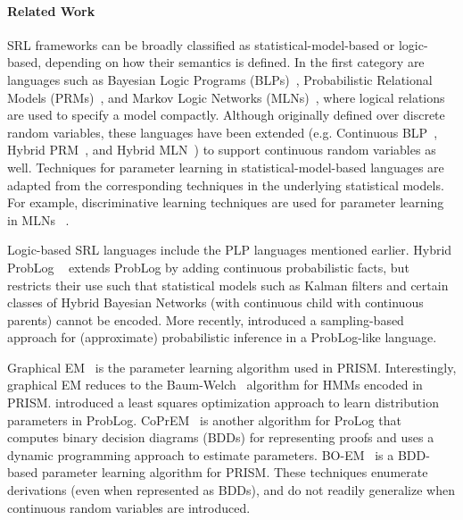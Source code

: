 \paragraph{Related Work}
SRL frameworks can be broadly classified as
statistical-model-based or logic-based, depending on how their
semantics is defined.  In the first category are languages such as
Bayesian Logic Programs (BLPs)~\cite{hblp}, Probabilistic Relational
Models (PRMs)~\cite{hprm}, and Markov Logic Networks (MLNs)~\cite{mln},
where logical relations are used to specify a model compactly.
Although originally defined over discrete random variables, these
languages have been extended (e.g.  Continuous
BLP~\cite{hblp}, Hybrid PRM~\cite{hprm}, and Hybrid
MLN~\cite{hmln}) to support continuous random variables as
well.  Techniques for parameter learning in statistical-model-based
languages are adapted from the corresponding techniques in the
underlying statistical models.  For example, discriminative learning
techniques are used for parameter learning in MLNs
~\cite{mlnlearningA,mlnlearningB}.

Logic-based SRL languages include the PLP languages mentioned earlier.
Hybrid ProbLog ~\cite{hproblog} extends ProbLog by adding
continuous probabilistic facts, but restricts their use such that
statistical models such as Kalman filters and certain classes of Hybrid Bayesian Networks
(with continuous child with continuous parents) 
cannot be encoded.  More recently,  introduced a
sampling-based approach for (approximate) probabilistic inference in a
ProbLog-like language. 

Graphical EM~\cite{sato} is the parameter learning algorithm used in
PRISM.  Interestingly, graphical EM reduces to the
Baum-Welch~\cite{rabiner} algorithm for HMMs encoded in PRISM.
 introduced a least squares optimization
approach to learn distribution parameters in ProbLog.
CoPrEM~\cite{probloglearningB} is another algorithm for ProLog that
computes binary decision diagrams (BDDs) for representing proofs and
uses a dynamic programming approach to estimate
parameters. BO-EM~\cite{satoBDD} is a BDD-based parameter learning
algorithm for PRISM.  These techniques enumerate derivations (even
when represented as BDDs), and do not readily generalize when
continuous random variables are introduced. 


